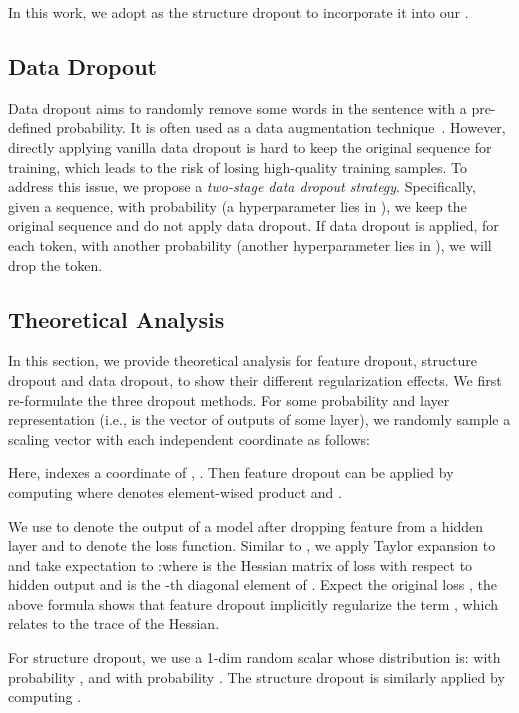 \documentclass[11pt]{article}
\begin{document}
In this work, we adopt  as the structure dropout to incorporate it into our . 



\subsection{Data Dropout}
Data dropout aims to randomly remove some words in the sentence with a pre-defined probability. It is often used as a data augmentation technique~\cite{DBLP:conf/emnlp/WeiZ19,xie2020unsupervised}. However, directly applying vanilla data dropout is hard to keep the original sequence for training, which leads to the risk of losing high-quality training samples. To address this issue, we propose a \emph{two-stage data dropout strategy}.
Specifically, given a sequence, with probability  (a hyperparameter lies in ), we keep the original sequence and do not apply data dropout. If data dropout is applied, for each token, with another probability  (another hyperparameter lies in ), we will drop the token. 








\subsection{Theoretical Analysis}

In this section, we provide theoretical analysis for feature dropout, structure dropout and data dropout, to show their different regularization effects. We first re-formulate the three dropout methods. For some probability  and layer representation  (i.e.,  is the vector of outputs of some layer), we randomly sample a scaling vector  with  each independent coordinate as follows:

Here,  indexes a coordinate of , . Then feature dropout can be applied by computing {\small}where  denotes element-wised product and . 

We use  to denote the output of a model after dropping feature from a hidden layer and  to denote the loss function. Similar to , we apply Taylor expansion to  and take expectation to :{\small}where {} is the Hessian matrix of loss with respect to hidden output {} and {} is the -th diagonal element of {}. Expect the original loss , the above formula shows that feature dropout implicitly regularize the term , which relates to the trace of the Hessian. 

For structure dropout, we use a 1-dim random scalar  whose distribution is:  with probability , and  with probability . The structure dropout is similarly applied by computing . 
\end{document}
